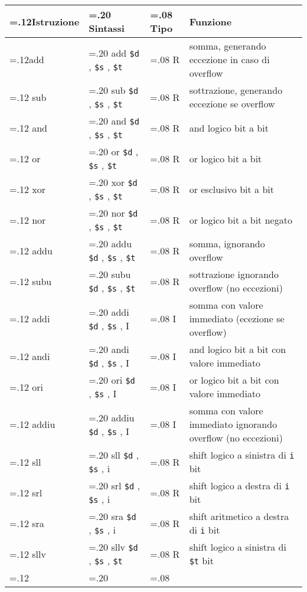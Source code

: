 \documentclass{standalone}
\providecommand\lightrule{%
	\arrayrulecolor{black!30}%
	\midrule[\lightrulewidth]%
	\arrayrulecolor{black}}
\providecommand\register[1]{%
	\texttt{#1}%
}
\begin{document}
\begin{tabularx}{\textwidth}{ >{\hsize=.12\textwidth}X >{\hsize=.20\textwidth}X >{\hsize=.08\textwidth}X X }
	\toprule
		Istruzione & Sintassi & Tipo & Funzione \\
	\midrule
		add & add \register{\$d}, \register{\$s}, \register{\$t} & R & somma, generando eccezione in caso di overflow \\\lightrule
		sub & sub \register{\$d}, \register{\$s}, \register{\$t} & R & sottrazione, generando eccezione se overflow \\\lightrule
		and & and \register{\$d}, \register{\$s}, \register{\$t} & R & and logico bit a bit \\\lightrule
		or & or \register{\$d}, \register{\$s}, \register{\$t} & R & or logico bit a bit \\\lightrule
		xor & xor \register{\$d}, \register{\$s}, \register{\$t} & R & or esclusivo bit a bit \\\lightrule
		nor & nor \register{\$d}, \register{\$s}, \register{\$t} & R & or logico bit a bit negato \\\lightrule
		addu & addu \register{\$d}, \register{\$s}, \register{\$t} & R & somma, ignorando overflow \\\lightrule
		subu & subu \register{\$d}, \register{\$s}, \register{\$t} & R & sottrazione ignorando overflow (no eccezioni) \\\lightrule
		addi & addi \register{\$d}, \register{\$s}, I & I & somma con valore immediato (ecezione se overflow) \\\lightrule
		andi & andi \register{\$d}, \register{\$s}, I & I & and logico bit a bit con valore immediato \\\lightrule
		ori & ori \register{\$d}, \register{\$s}, I & I & or logico bit a bit con valore immediato \\\lightrule
		addiu &  addiu \register{\$d}, \register{\$s}, I & I & somma con valore immediato ignorando overflow (no eccezioni) \\\lightrule
		sll & sll \register{\$d}, \register{\$s}, i & R & shift logico a sinistra di \register{i} bit \\\lightrule
		srl & srl \register{\$d}, \register{\$s}, i & R & shift logico a destra di \register{i} bit \\\lightrule
		sra & sra \register{\$d}, \register{\$s}, i & R & shift aritmetico a destra di \register{i} bit \\\lightrule
		sllv & sllv \register{\$d}, \register{\$s}, \register{\$t} & R & shift logico a sinistra di \register{\$t} bit \\\lightrule

\end{tabularx}
\end{document}
